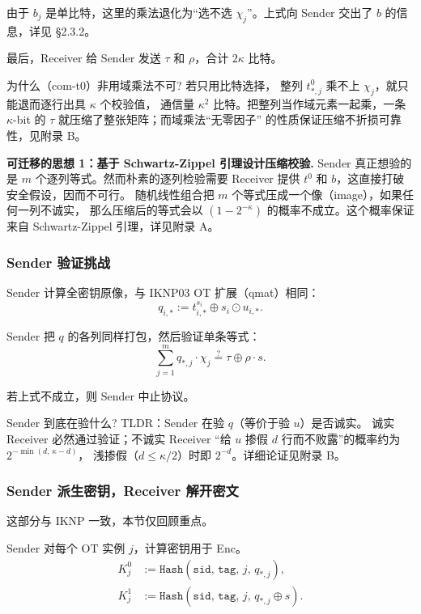 由于 $b_j$ 是单比特，这里的乘法退化为“选不选 $\chi_j$”。上式向
Sender 交出了 $b$ 的信息，详见 §2.3.2。

最后，Receiver 给 Sender 发送 $\tau$ 和 $\rho$，合计 $2\kappa$ 比特。

为什么（com-t0）非用域乘法不可? 若只用比特选择，
整列 $t^0_{*,j}$ 乘不上 $\chi_j$，就只能退而逐行出具 $\kappa$ 个校验值，
通信量 $\kappa^2$ 比特。把整列当作域元素一起乘，一条 $\kappa$-bit
的 $\tau$ 就压缩了整张矩阵；而域乘法“无零因子”
的性质保证压缩不折损可靠性，见附录 B。

\textbf{可迁移的思想 1：基于 Schwartz-Zippel 引理设计压缩校验.} Sender
真正想验的是 $m$ 个逐列等式。然而朴素的逐列检验需要 Receiver
提供 $t^0$ 和 $b$，这直接打破安全假设，因而不可行。
随机线性组合把 $m$ 个等式压成一个像（image），如果任何一列不诚实，
那么压缩后的等式会以 $(1 - 2^{-\kappa})$ 的概率不成立。这个概率保证来自
Schwartz-Zippel 引理，详见附录 A。

\subsubsection{Sender 验证挑战}

Sender 计算全密钥原像，与 IKNP03 OT 扩展（qmat）相同：
\begin{equation}\label{eq:02-kos15:qmat}
q_{i,*} := t_{i,*}^{s_i} \oplus s_i \odot u_{i,*}. \tag{qmat}
\end{equation}

Sender 把 $q$ 的各列同样打包，然后验证单条等式：
\begin{equation}\label{eq:02-kos15:verify}
\sum_{j=1}^{m} q_{*,j} \cdot \chi_j
\stackrel{?}{=}
\tau \oplus \rho \cdot s. \tag{verify}
\end{equation}

若上式不成立，则 Sender 中止协议。

Sender 到底在验什么? TLDR：Sender 在验 $q$（等价于验 $u$）是否诚实。
诚实 Receiver 必然通过验证；不诚实 Receiver
“给 $u$ 掺假 $d$ 行而不败露”的概率约为 $2^{-\min(d,\,\kappa-d)}$，
浅掺假（$d \le \kappa/2$）时即 $2^{-d}$。详细论证见附录 B。

\subsubsection{Sender 派生密钥，Receiver 解开密文}

这部分与 IKNP 一致，本节仅回顾重点。

Sender 对每个 OT 实例 $j$，计算密钥用于 Enc。
\begin{align}K^0_j &:= \mathtt{Hash}\left(\mathtt{sid},\,\mathtt{tag},\,j,\,q_{*,j}\right), \\
K^1_j &:= \mathtt{Hash}\left(\mathtt{sid},\,\mathtt{tag},\,j,\,q_{*,j} \oplus s\right).
\end{align}

